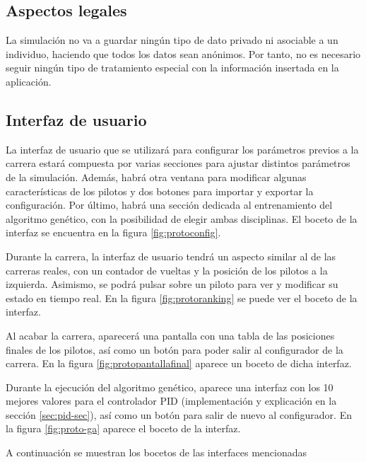 \subsection{Aspectos legales}

La simulación no va a guardar ningún tipo de dato privado ni asociable a un individuo, haciendo que todos los datos sean anónimos. Por tanto, no es necesario seguir ningún tipo de tratamiento especial con la información insertada en la aplicación.

\subsection{Interfaz de usuario}
\label{sec:proto-ui}


La interfaz de usuario que se utilizará para configurar los parámetros previos a la carrera estará compuesta por varias secciones para ajustar distintos parámetros de la simulación. Además, habrá otra ventana para modificar algunas características de los pilotos y dos botones para importar y exportar la configuración. Por último, habrá una sección dedicada al entrenamiento del algoritmo genético, con la posibilidad de elegir ambas disciplinas. El boceto de la interfaz se encuentra en la figura \ref{fig:protoconfig}.

\bigskip

Durante la carrera, la interfaz de usuario tendrá un aspecto similar al de las carreras reales, con un contador de vueltas y la posición de los pilotos a la izquierda. Asimismo, se podrá pulsar sobre un piloto para ver y modificar su estado en tiempo real. En la figura \ref{fig:protoranking} se puede ver el boceto de la interfaz.

\bigskip

Al acabar la carrera, aparecerá una pantalla con una tabla de las posiciones finales de los pilotos, así como un botón para poder salir al configurador de la carrera. En la figura \ref{fig:protopantallafinal} aparece un boceto de dicha interfaz.

\bigskip

Durante la ejecución del algoritmo genético, aparece una interfaz con los 10 mejores valores para el controlador PID (implementación y explicación en la sección \ref{sec:pid-sec}), así como un botón para salir de nuevo al configurador. En la figura \ref{fig:proto-ga} aparece el boceto de la interfaz.

A continuación se muestran los bocetos de las interfaces mencionadas

